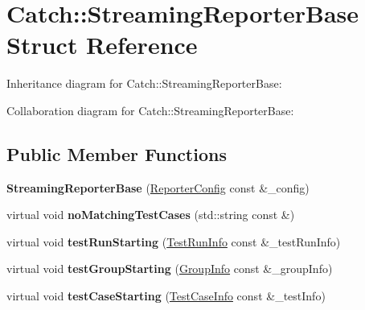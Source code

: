 \hypertarget{structCatch_1_1StreamingReporterBase}{}\section{Catch\+:\+:Streaming\+Reporter\+Base Struct Reference}
\label{structCatch_1_1StreamingReporterBase}


Inheritance diagram for Catch\+:\+:Streaming\+Reporter\+Base\+:


Collaboration diagram for Catch\+:\+:Streaming\+Reporter\+Base\+:
\subsection*{Public Member Functions}
\begin{DoxyCompactItemize}
\item 
{\bfseries Streaming\+Reporter\+Base} (\hyperlink{structCatch_1_1ReporterConfig}{Reporter\+Config} const \&\+\_\+config)\hypertarget{structCatch_1_1StreamingReporterBase_a917efb4cef0198b4f2f41f40bfda0459}{}\label{structCatch_1_1StreamingReporterBase_a917efb4cef0198b4f2f41f40bfda0459}

\item 
virtual void {\bfseries no\+Matching\+Test\+Cases} (std\+::string const \&)\hypertarget{structCatch_1_1StreamingReporterBase_a5f315896a20f8c67274d3587657a4c9e}{}\label{structCatch_1_1StreamingReporterBase_a5f315896a20f8c67274d3587657a4c9e}

\item 
virtual void {\bfseries test\+Run\+Starting} (\hyperlink{structCatch_1_1TestRunInfo}{Test\+Run\+Info} const \&\+\_\+test\+Run\+Info)\hypertarget{structCatch_1_1StreamingReporterBase_a0f97c112f559488dfb998c0e14bde600}{}\label{structCatch_1_1StreamingReporterBase_a0f97c112f559488dfb998c0e14bde600}

\item 
virtual void {\bfseries test\+Group\+Starting} (\hyperlink{structCatch_1_1GroupInfo}{Group\+Info} const \&\+\_\+group\+Info)\hypertarget{structCatch_1_1StreamingReporterBase_a2731bbea2eb6150d1bed4df25c1a747b}{}\label{structCatch_1_1StreamingReporterBase_a2731bbea2eb6150d1bed4df25c1a747b}

\item 
virtual void {\bfseries test\+Case\+Starting} (\hyperlink{structCatch_1_1TestCaseInfo}{Test\+Case\+Info} const \&\+\_\+test\+Info)\hypertarget{structCatch_1_1StreamingReporterBase_add5764ac7e0a90833d0ef601b09fc52d}{}\label{structCatch_1_1StreamingReporterBase_add5764ac7e0a90833d0ef601b09fc52d}


\end{DoxyCompactItemize}
